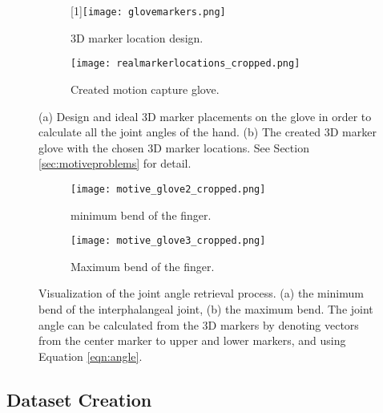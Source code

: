 \documentclass[../main.tex]{subfiles}
\begin{document}
\begin{figure}[H]
    \centering
    \begin{subfigure}[b]{0.49\textwidth}
        \centering
        \scalebox{-1}[1]{\texttt{[image: glovemarkers.png]}}
        \caption{3D marker location design.}
        \label{fig:markerdesign}
    \end{subfigure}
    \hfill
    \centering
    \begin{subfigure}[b]{0.49\textwidth}
        \centering
        \texttt{[image: realmarkerlocations\_cropped.png]}
        \caption{Created motion capture glove.}
        \label{fig:realmarkers}
    \end{subfigure}
    \caption{(a) Design and ideal 3D marker placements on the glove in order to calculate all the joint angles of the hand. (b) The created 3D marker glove with the chosen 3D marker locations. See Section \ref{sec:motiveproblems} for detail.}
\end{figure}

\begin{figure}[H]
    \begin{subfigure}[b]{0.49\textwidth}
        \centering
        \texttt{[image: motive\_glove2\_cropped.png]}
        \caption{minimum bend of the finger.}
        \label{fig:minbend}
    \end{subfigure}
    \hfill
    \begin{subfigure}[b]{0.49\textwidth}
        \centering
        \texttt{[image: motive\_glove3\_cropped.png]}
        \caption{Maximum bend of the finger.}
        \label{fig:maxbend}
    \end{subfigure}
    \caption{Visualization of the joint angle retrieval process. (a) the minimum bend of the \gls{interphalangeal joint}, (b) the maximum bend. The joint angle can be calculated from the 3D markers by denoting vectors from the center marker to upper and lower markers, and using Equation \eqref{eqn:angle}.}

\end{figure}

\subsection{Dataset Creation}
\label{sec:dataset}
\end{document}
